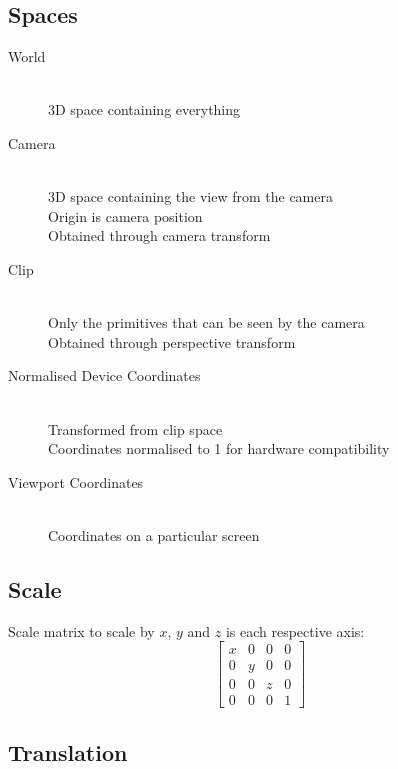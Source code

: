\documentclass[a4paper]{article}
\begin{document}
\subsection{Spaces}

\begin{description}
  \item[World] \hfill \\
    3D space containing everything

  \item[Camera] \hfill \\
    3D space containing the view from the camera \\
    Origin is camera position \\
    Obtained through camera transform

  \item[Clip] \hfill \\
    Only the primitives that can be seen by the camera \\
    Obtained through perspective transform

  \item[Normalised Device Coordinates] \hfill \\
    Transformed from clip space \\
    Coordinates normalised to 1 for hardware compatibility

  \item[Viewport Coordinates] \hfill \\
    Coordinates on a particular screen

\end{description}

\subsection{Scale}

Scale matrix to scale by $x$, $y$ and $z$ is each respective axis:
\[
  \left [
    \begin{array}{cccc}
      x & 0 & 0 & 0 \\
      0 & y & 0 & 0 \\
      0 & 0 & z & 0 \\
      0 & 0 & 0 & 1
    \end{array}
  \right ]
\]

\subsection{Translation}
\end{document}
